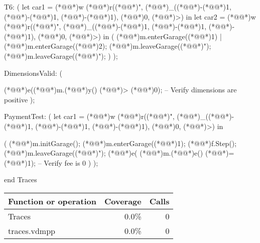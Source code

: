 \documentclass[a4paper]{article}
\begin{document}
\begin{vdm_al}
T6:
(
    let car1 = (*@@*)w (*@@*)r((*@@*)", (*@@*)_((*@\vdmnotcovered{}@*)-(*@\vdmnotcovered{}@*)1, (*@\vdmnotcovered{}@*)-(*@\vdmnotcovered{}@*)1, (*@\vdmnotcovered{}@*)-(*@\vdmnotcovered{}@*)1), (*@\vdmnotcovered{}@*)0, (*@@*)>) in
    let car2 = (*@@*)w (*@@*)r((*@@*)", (*@@*)_((*@\vdmnotcovered{}@*)-(*@\vdmnotcovered{}@*)1, (*@\vdmnotcovered{}@*)-(*@\vdmnotcovered{}@*)1, (*@\vdmnotcovered{}@*)-(*@\vdmnotcovered{}@*)1), (*@\vdmnotcovered{}@*)0, (*@@*)>) in
    (
        (*@@*)m.enterGarage((*@@*)1) | (*@@*)m.enterGarage((*@@*)2);
        (*@@*)m.leaveGarage((*@@*)");
        (*@@*)m.leaveGarage((*@@*)");
    )
);




DimensionsValid:
(
   
    (*@@*)e((*@@*)m.(*@@*)y() (*@\vdmnotcovered{}@*)> (*@\vdmnotcovered{}@*)0);  -- Verify dimensions are positive
);

PaymentTest:
(
    let car1 = (*@@*)w (*@@*)r((*@@*)", (*@@*)_((*@\vdmnotcovered{}@*)-(*@\vdmnotcovered{}@*)1, (*@\vdmnotcovered{}@*)-(*@\vdmnotcovered{}@*)1, (*@\vdmnotcovered{}@*)-(*@\vdmnotcovered{}@*)1), (*@\vdmnotcovered{}@*)0, (*@@*)>) in
        
    (
        (*@@*)m.initGarage();
        (*@@*)m.enterGarage((*@@*)1);
        (*@@*)f.Step();
        (*@@*)m.leaveGarage((*@@*)");
        (*@@*)e( (*@@*)m.(*@@*)e() (*@\vdmnotcovered{}@*)= (*@\vdmnotcovered{}@*)1);  -- Verify fee is 0
    )
);





end Traces
\end{vdm_al}
\bigskip
\begin{longtable}{|l|r|r|}
\hline
Function or operation & Coverage & Calls \\
\hline
\hline
Traces & 0.0\% & 0 \\
\hline
\hline
traces.vdmpp & 0.0\% & 0 \\
\hline
\end{longtable}
\end{document}
